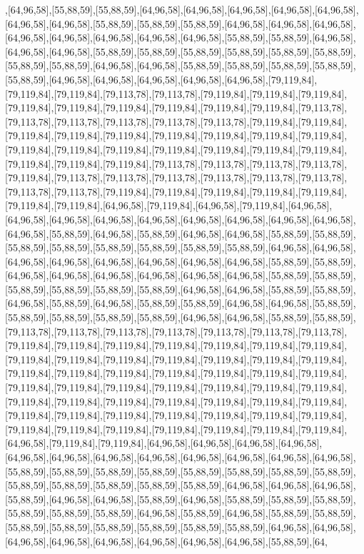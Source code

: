 ,[64,96,58],[55,88,59],[55,88,59],[64,96,58],[64,96,58],[64,96,58],[64,96,58],[64,96,58],[64,96,58],[64,96,58],[55,88,59],[55,88,59],[55,88,59],[64,96,58],[64,96,58],[64,96,58],[64,96,58],[64,96,58],[64,96,58],[64,96,58],[64,96,58],[55,88,59],[55,88,59],[64,96,58],[64,96,58],[64,96,58],[55,88,59],[55,88,59],[55,88,59],[55,88,59],[55,88,59],[55,88,59],[55,88,59],[55,88,59],[64,96,58],[64,96,58],[55,88,59],[55,88,59],[55,88,59],[55,88,59],[55,88,59],[64,96,58],[64,96,58],[64,96,58],[64,96,58],[64,96,58],[79,119,84],[79,119,84],[79,119,84],[79,113,78],[79,113,78],[79,119,84],[79,119,84],[79,119,84],[79,119,84],[79,119,84],[79,119,84],[79,119,84],[79,119,84],[79,119,84],[79,113,78],[79,113,78],[79,113,78],[79,113,78],[79,113,78],[79,113,78],[79,119,84],[79,119,84],[79,119,84],[79,119,84],[79,119,84],[79,119,84],[79,119,84],[79,119,84],[79,119,84],[79,119,84],[79,119,84],[79,119,84],[79,119,84],[79,119,84],[79,119,84],[79,119,84],[79,119,84],[79,119,84],[79,119,84],[79,113,78],[79,113,78],[79,113,78],[79,113,78],[79,119,84],[79,113,78],[79,113,78],[79,113,78],[79,113,78],[79,113,78],[79,113,78],[79,113,78],[79,113,78],[79,119,84],[79,119,84],[79,119,84],[79,119,84],[79,119,84],[79,119,84],[79,119,84],[64,96,58],[79,119,84],[64,96,58],[79,119,84],[64,96,58],[64,96,58],[64,96,58],[64,96,58],[64,96,58],[64,96,58],[64,96,58],[64,96,58],[64,96,58],[64,96,58],[55,88,59],[64,96,58],[55,88,59],[64,96,58],[64,96,58],[55,88,59],[55,88,59],[55,88,59],[55,88,59],[55,88,59],[55,88,59],[55,88,59],[55,88,59],[64,96,58],[64,96,58],[64,96,58],[64,96,58],[64,96,58],[64,96,58],[64,96,58],[64,96,58],[55,88,59],[55,88,59],[64,96,58],[64,96,58],[64,96,58],[64,96,58],[64,96,58],[64,96,58],[55,88,59],[55,88,59],[55,88,59],[55,88,59],[55,88,59],[55,88,59],[64,96,58],[64,96,58],[55,88,59],[55,88,59],[64,96,58],[55,88,59],[64,96,58],[55,88,59],[55,88,59],[64,96,58],[64,96,58],[55,88,59],[55,88,59],[55,88,59],[55,88,59],[55,88,59],[64,96,58],[64,96,58],[55,88,59],[55,88,59],[79,113,78],[79,113,78],[79,113,78],[79,113,78],[79,113,78],[79,113,78],[79,113,78],[79,119,84],[79,119,84],[79,119,84],[79,119,84],[79,119,84],[79,119,84],[79,119,84],[79,119,84],[79,119,84],[79,119,84],[79,119,84],[79,119,84],[79,119,84],[79,119,84],[79,119,84],[79,119,84],[79,119,84],[79,119,84],[79,119,84],[79,119,84],[79,119,84],[79,119,84],[79,119,84],[79,119,84],[79,119,84],[79,119,84],[79,119,84],[79,119,84],[79,119,84],[79,119,84],[79,119,84],[79,119,84],[79,119,84],[79,119,84],[79,119,84],[79,119,84],[79,119,84],[79,119,84],[79,119,84],[79,119,84],[79,119,84],[79,119,84],[79,119,84],[79,119,84],[79,119,84],[79,119,84],[79,119,84],[79,119,84],[79,119,84],[64,96,58],[79,119,84],[79,119,84],[64,96,58],[64,96,58],[64,96,58],[64,96,58],[64,96,58],[64,96,58],[64,96,58],[64,96,58],[64,96,58],[64,96,58],[64,96,58],[64,96,58],[55,88,59],[55,88,59],[55,88,59],[55,88,59],[55,88,59],[55,88,59],[55,88,59],[55,88,59],[55,88,59],[55,88,59],[55,88,59],[55,88,59],[55,88,59],[64,96,58],[64,96,58],[64,96,58],[55,88,59],[64,96,58],[64,96,58],[55,88,59],[64,96,58],[55,88,59],[55,88,59],[55,88,59],[55,88,59],[55,88,59],[55,88,59],[64,96,58],[55,88,59],[64,96,58],[55,88,59],[55,88,59],[55,88,59],[55,88,59],[55,88,59],[55,88,59],[55,88,59],[55,88,59],[64,96,58],[64,96,58],[64,96,58],[64,96,58],[64,96,58],[64,96,58],[64,96,58],[64,96,58],[55,88,59],[64,